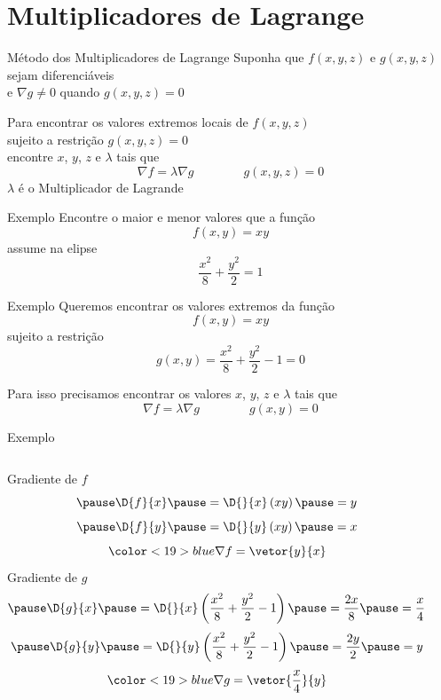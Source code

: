 \section{Multiplicadores de Lagrange}


\begin{frame}{Método dos Multiplicadores de Lagrange}
  Suponha que \(f(x, y, z)\) e \(g(x, y, z)\) sejam diferenciáveis\\[2mm]
  e \(\nabla g\neq 0\) quando \(g(x, y, z)=0\)

  \pause
  \vspace{\baselineskip}
  Para encontrar os valores extremos locais de \(f(x, y, z)\) \\[2mm]
  \pause
  sujeito a restrição \(g(x, y, z)=0\) \\[2mm]
  \pause
  encontre $x$, $y$, $z$ e $\lambda$ tais que
  \[
    \nabla f = \lambda \nabla g
    \qquad\qquad
    g(x, y, z) = 0
  \]
  \pause
  \(\lambda\) é o Multiplicador de Lagrande
\end{frame}

\addtocounter{exemplo}{1}
\begin{frame}{Exemplo \theexemplo}
  Encontre o maior e menor valores que a função
  \[
    f(x, y) = xy
  \]
  assume na elipse
  \[
    \frac{x^2}{8} + \frac{y^2}{2} = 1
  \]
\end{frame}

\begin{frame}{Exemplo \theexemplo}
  Queremos encontrar os valores extremos da função
  \[
    f(x, y) = xy
  \]
  \pause
  sujeito a restrição
  \[
    g(x, y) = \frac{x^2}{8} + \frac{y^2}{2} - 1 = 0
  \]

  \pause
  Para isso precisamos encontrar os valores $x$, $y$, $z$ e $\lambda$ tais que
  \[
    \nabla f = \lambda \nabla g
    \qquad\qquad
    g(x, y) = 0
  \]
\end{frame}

\begin{frame}{Exemplo \theexemplo}
\begin{columns}
  Gradiente de $f$
  \[
    \pause
    \D{f}{x}
    \pause
    = \D{}{x}\left(xy\right)
    \pause
    = y
  \]
  \[
    \pause
    \D{f}{y}
    \pause
    = \D{}{y}\left(xy\right)
    \pause
    = x
  \]
  \pause
  \[
    {\color<19>{blue}\nabla f = \vetor{y}{x}}
  \]
  \pause
  Gradiente de $g$
  \[
    \pause
    \D{g}{x}
    \pause
    = \D{}{x}\left(\frac{x^2}{8} + \frac{y^2}{2} - 1\right)
    \pause
    = \frac{2x}{8}
    \pause
    = \frac{x}{4}
  \]
  \[
    \pause
    \D{g}{y}
    \pause
    = \D{}{y}\left(\frac{x^2}{8} + \frac{y^2}{2} - 1 \right)
    \pause
    = \frac{2y}{2}
    \pause
    = y
  \]
  \pause
  \[
    {\color<19>{blue}\nabla g = \vetor{\dfrac{x}{4}}{y}}
  \]
\end{columns}
\end{frame}

